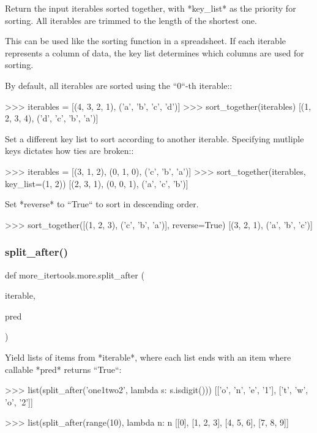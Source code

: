 \begin{DoxyVerb}Return the input iterables sorted together, with *key_list* as the
priority for sorting. All iterables are trimmed to the length of the
shortest one.

This can be used like the sorting function in a spreadsheet. If each
iterable represents a column of data, the key list determines which
columns are used for sorting.

By default, all iterables are sorted using the ``0``-th iterable::

    >>> iterables = [(4, 3, 2, 1), ('a', 'b', 'c', 'd')]
    >>> sort_together(iterables)
    [(1, 2, 3, 4), ('d', 'c', 'b', 'a')]

Set a different key list to sort according to another iterable.
Specifying mutliple keys dictates how ties are broken::

    >>> iterables = [(3, 1, 2), (0, 1, 0), ('c', 'b', 'a')]
    >>> sort_together(iterables, key_list=(1, 2))
    [(2, 3, 1), (0, 0, 1), ('a', 'c', 'b')]

Set *reverse* to ``True`` to sort in descending order.

    >>> sort_together([(1, 2, 3), ('c', 'b', 'a')], reverse=True)
    [(3, 2, 1), ('a', 'b', 'c')]\end{DoxyVerb}
 \mbox{\label{namespacemore__itertools_1_1more_a2d8834aefe73a3081dec6e364edc5099}} 
\subsubsection{\texorpdfstring{split\+\_\+after()}{split\_after()}}
{\footnotesize\ttfamily def more\+\_\+itertools.\+more.\+split\+\_\+after (\begin{DoxyParamCaption}\item[{}]{iterable,  }\item[{}]{pred }\end{DoxyParamCaption})}

\begin{DoxyVerb}Yield lists of items from *iterable*, where each list ends with an
item where callable *pred* returns ``True``:

    >>> list(split_after('one1two2', lambda s: s.isdigit()))
    [['o', 'n', 'e', '1'], ['t', 'w', 'o', '2']]

    >>> list(split_after(range(10), lambda n: n %
    [[0], [1, 2, 3], [4, 5, 6], [7, 8, 9]]\end{DoxyVerb}
 \mbox{\label{namespacemore__itertools_1_1more_a07d0efe8d88585439d31fc758762b749}} 
